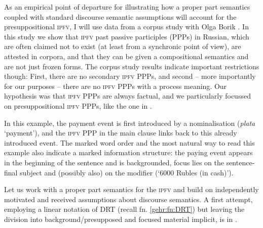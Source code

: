 \documentclass[output=paper]{langscibook}
\begin{document}
As an empirical point of departure for illustrating how a proper part semantics coupled with standard discourse semantic assumptions will account for the presuppositional \textsc{ipfv}, I will use data from a corpus study with Olga Borik \citep{borikgehrkefdsl}. In this study we show that \textsc{ipfv} past passive participles (PPPs) in Russian, which are often claimed not to exist (at least from a synchronic point of view), are attested in corpora, and that they can be given a compositional semantics and are not just frozen forms. The corpus study results indicate important restrictions though: First, there are no secondary \textsc{ipfv} PPPs, and second -- more importantly for our purposes -- there are no \textsc{ipfv} PPPs with a process meaning. Our hypothesis was that \textsc{ipfv} PPPs are always factual, and we particularly focussed on presuppositional \textsc{ipfv} PPPs, like the one in  \citep[from][]{borikgehrkefdsl}.

\label{gehr:ex:platy}
\z 

\noindent In this example, the payment event is first introduced by a nominalisation (\textit{plata} `payment'), and the \textsc{ipfv} PPP in the main clause links back to this already introduced event. The marked word order and the most natural way to read this example also indicate a marked information structure: the paying event appears in the beginning of the sentence and is backgrounded, focus lies on the sentence-final subject and (possibly also) on the modifier (`6000 Rubles (in cash)'). 

Let us work with a proper part semantics for the \textsc{ipfv} and build on independently motivated and received assumptions about discourse semantics. A first attempt, employing a linear notation of DRT (recall fn. \ref{gehr:fn:DRT}) but leaving the division into background/presupposed and focused material implicit, is in .

\ea[] {$[e_1, e_2, t, n, x\,|\,\textsc{payment}(e_1), \textsc{pay}(e_2), e_2 = e_1,$\\ $\cnst{theme}(e_2, x), \textsc{6,000R}(x), \textsc{in-cash}(e_2), t \subset \tau(e_2), t < n]$}\label{gehr:ex:try1}
\z 
\end{document}
